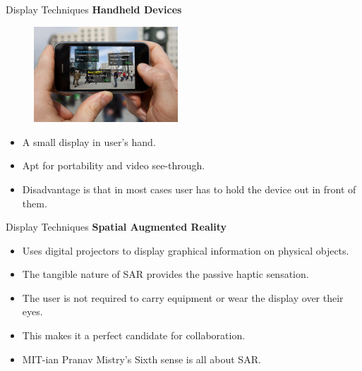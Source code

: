 \documentclass{beamer}
\begin{document}
\begin{frame}{Display Techniques}
\textbf{Handheld Devices}
	\begin{figure}
  		\begin{center}
    			\includegraphics[width=0.48\textwidth]{handheld.jpg}
  		\end{center}
	\end{figure}
	\begin{itemize}
		\item A small display in user's hand.
		\item Apt for portability and video see-through.
		\item Disadvantage is that in most cases user has to hold the device out in front of them.
	\end{itemize}
\end{frame}


\begin{frame}{Display Techniques}
\textbf{Spatial Augmented Reality}
	\begin{itemize}
		\item Uses digital projectors to display graphical information on physical objects.
		\item The tangible nature of SAR provides the passive haptic sensation.
		\item The user is not required to carry equipment or wear the display over their eyes.
		\item This makes it a perfect candidate for collaboration.
		\item MIT-ian Pranav Mistry's Sixth sense is all about SAR.
	\end{itemize}
\end{frame}
\end{document}

